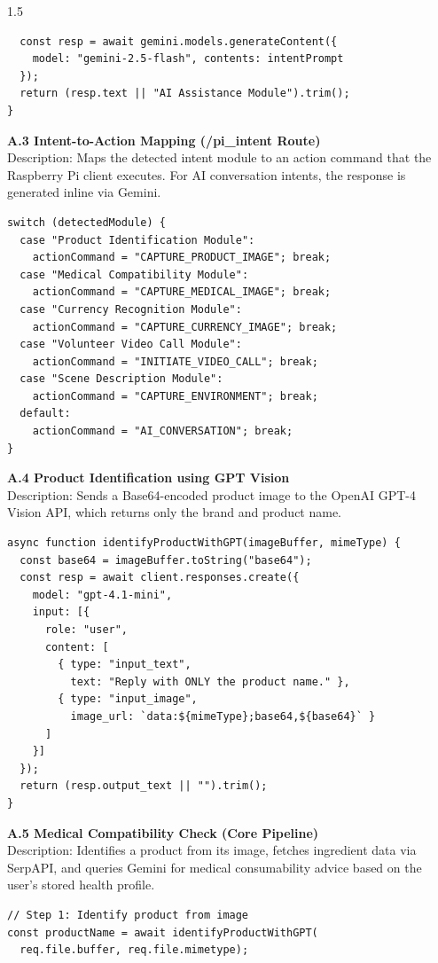 \begin{spacing}{1.5}
\begin{verbatim}
  const resp = await gemini.models.generateContent({
    model: "gemini-2.5-flash", contents: intentPrompt
  });
  return (resp.text || "AI Assistance Module").trim();
}
\end{verbatim}

\noindent \textbf{A.3 Intent-to-Action Mapping (/pi\_intent Route)}\\
Description: Maps the detected intent module to an action command that the Raspberry Pi client executes. For AI conversation intents, the response is generated inline via Gemini.
\begin{verbatim}
switch (detectedModule) {
  case "Product Identification Module":
    actionCommand = "CAPTURE_PRODUCT_IMAGE"; break;
  case "Medical Compatibility Module":
    actionCommand = "CAPTURE_MEDICAL_IMAGE"; break;
  case "Currency Recognition Module":
    actionCommand = "CAPTURE_CURRENCY_IMAGE"; break;
  case "Volunteer Video Call Module":
    actionCommand = "INITIATE_VIDEO_CALL"; break;
  case "Scene Description Module":
    actionCommand = "CAPTURE_ENVIRONMENT"; break;
  default:
    actionCommand = "AI_CONVERSATION"; break;
}
\end{verbatim}
\thispagestyle{empty}
\noindent \textbf{A.4 Product Identification using GPT Vision}\\
Description: Sends a Base64-encoded product image to the OpenAI GPT-4 Vision API, which returns only the brand and product name.
\begin{verbatim}
async function identifyProductWithGPT(imageBuffer, mimeType) {
  const base64 = imageBuffer.toString("base64");
  const resp = await client.responses.create({
    model: "gpt-4.1-mini",
    input: [{
      role: "user",
      content: [
        { type: "input_text",
          text: "Reply with ONLY the product name." },
        { type: "input_image",
          image_url: `data:${mimeType};base64,${base64}` }
      ]
    }]
  });
  return (resp.output_text || "").trim();
}
\end{verbatim}

\noindent \textbf{A.5 Medical Compatibility Check (Core Pipeline)}\\
Description: Identifies a product from its image, fetches ingredient data via SerpAPI, and queries Gemini for medical consumability advice based on the user's stored health profile.
\begin{verbatim}
// Step 1: Identify product from image
const productName = await identifyProductWithGPT(
  req.file.buffer, req.file.mimetype);


\end{verbatim}
\end{spacing}
